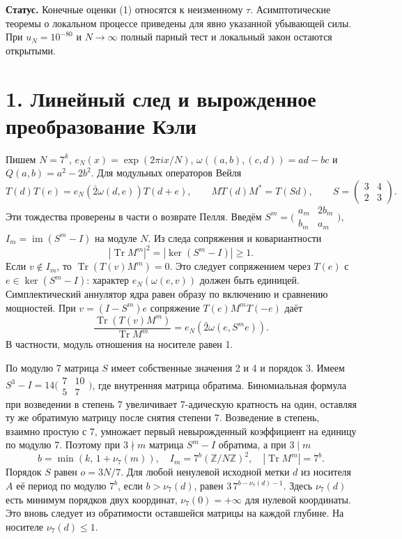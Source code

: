 \documentclass[11pt,a4paper]{article}
\newcommand{\Tr}{\operatorname{Tr}}
\newcommand{\Z}{\mathbb Z}
\newcommand{\sect}[1]{\section*{\sffamily\color{ink}#1}}
\begin{document}
\textbf{Статус.} Конечные оценки (1) относятся к неизменному $\tau$. Асимптотические теоремы о локальном процессе приведены для явно указанной убывающей силы. При $u_N=10^{-80}$ и $N\to\infty$ полный парный тест и локальный закон остаются открытыми.
\newpage
\sect{1. Линейный след и вырожденное преобразование Кэли}
Пишем $N=7^k$, $e_N(x)=\exp(2\pi i x/N)$, $\omega((a,b),(c,d))=ad-bc$ и $Q(a,b)=a^2-2b^2$. Для модульных операторов Вейля
\[
 T(d)T(e)=e_N(\bar2\omega(d,e))T(d+e),\qquad
 M T(d)M^*=T(Sd),\qquad S=\begin{pmatrix}3&4\\2&3\end{pmatrix}.
\]
Эти тождества проверены в части о возврате Пелля. Введём $S^m=\bigl(\begin{smallmatrix} a_m&2b_m\\b_m&a_m\end{smallmatrix}\bigr)$, $I_m=\operatorname{im}(S^m-I)$ на модуле $N$. Из следа сопряжения и ковариантности
\[
       |\Tr M^m|^2=|\ker(S^m-I)|\ge1.                               \tag{2}
\]
Если $v\notin I_m$, то $\Tr(T(v)M^m)=0$. Это следует сопряжением через $T(e)$ с $e\in\ker(S^m-I)$: характер $e_N(\omega(e,v))$ должен быть единицей. Симплектический аннулятор ядра равен образу по включению и сравнению мощностей. При $v=(I-S^m)e$ сопряжение $T(e)M^mT(-e)$ даёт
\[
              \frac{\Tr(T(v)M^m)}{\Tr M^m}
                         =e_N(\bar2\omega(e,S^m e)).                \tag{3}
\]
В частности, модуль отношения на носителе равен 1.

По модулю 7 матрица $S$ имеет собственные значения 2 и 4 и порядок 3. Имеем $S^3-I=14\bigl(\begin{smallmatrix}7&10\\5&7\end{smallmatrix}\bigr)$, где внутренняя матрица обратима. Биномиальная формула при возведении в степень 7 увеличивает 7-адическую кратность на один, оставляя ту же обратимую матрицу после снятия степени 7. Возведение в степень, взаимно простую с 7, умножает первый невырожденный коэффициент на единицу по модулю 7. Поэтому при $3\nmid m$ матрица $S^m-I$ обратима, а при $3\mid m$
\[
       b=\min(k,\,1+\nu_7(m)),\quad
       I_m=7^b(\Z/N\Z)^2,\quad |\Tr M^m|=7^b.                      \tag{4}
\]
Порядок $S$ равен $o=3N/7$. Для любой ненулевой исходной метки $d$ из носителя $A$ её период по модулю $7^b$, если $b>\nu_7(d)$, равен $3\,7^{b-\nu_7(d)-1}$. Здесь $\nu_7(d)$ есть минимум порядков двух координат, $\nu_7(0)=+\infty$ для нулевой координаты. Это вновь следует из обратимости оставшейся матрицы на каждой глубине. На носителе $\nu_7(d)\le1$.
\end{document}
